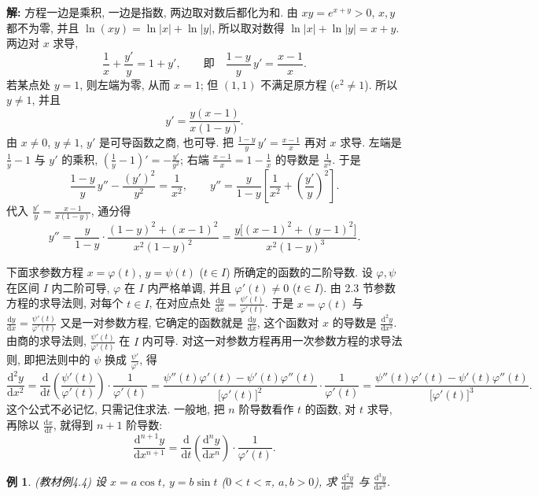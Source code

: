 \documentclass[UTF8,openany]{ctexbook}
\theoremstyle{chinesetextbook}
\newtheorem{example}{例}[section]
\newenvironment{cnsolution}{\par\indent\textbf{解:} \ignorespaces}{\par}
\newcommand{\dd}{\mathrm d}
\begin{document}
\begin{cnsolution}
方程一边是乘积, 一边是指数, 两边取对数后都化为和. 由 $xy=e^{x+y}>0$, $x,y$ 都不为零, 并且 $\ln(xy)=\ln|x|+\ln|y|$, 所以取对数得 $\ln|x|+\ln|y|=x+y$. 两边对 $x$ 求导,
\[
\frac1x+\frac{y'}y=1+y',\qquad\text{即}\quad\frac{1-y}y\,y'=\frac{x-1}x.
\]
若某点处 $y=1$, 则左端为零, 从而 $x=1$; 但 $(1,1)$ 不满足原方程 ($e^2\ne1$). 所以 $y\ne1$, 并且
\[
y'=\frac{y(x-1)}{x(1-y)}.
\]
由 $x\ne0$, $y\ne1$, $y'$ 是可导函数之商, 也可导. 把 $\displaystyle\frac{1-y}y\,y'=\frac{x-1}x$ 再对 $x$ 求导. 左端是 $\displaystyle\frac1y-1$ 与 $y'$ 的乘积, $\displaystyle\left(\frac1y-1\right)'=-\frac{y'}{y^2}$; 右端 $\displaystyle\frac{x-1}x=1-\frac1x$ 的导数是 $\displaystyle\frac1{x^2}$. 于是
\[
\frac{1-y}y\,y''-\frac{(y')^2}{y^2}=\frac1{x^2},\qquad y''=\frac y{1-y}\left[\frac1{x^2}+\left(\frac{y'}y\right)^2\right].
\]
代入 $\displaystyle\frac{y'}y=\frac{x-1}{x(1-y)}$, 通分得
\[
y''=\frac y{1-y}\cdot\frac{(1-y)^2+(x-1)^2}{x^2(1-y)^2}=\frac{y\bigl[(x-1)^2+(y-1)^2\bigr]}{x^2(1-y)^3}.
\]
\end{cnsolution}
下面求参数方程 $x=\varphi(t)$, $y=\psi(t)$ ($t\in I$) 所确定的函数的二阶导数. 设 $\varphi,\psi$ 在区间 $I$ 内二阶可导, $\varphi$ 在 $I$ 内严格单调, 并且 $\varphi'(t)\ne0$ ($t\in I$). 由 2.3 节参数方程的求导法则, 对每个 $t\in I$, 在对应点处 $\displaystyle\frac{\dd y}{\dd x}=\frac{\psi'(t)}{\varphi'(t)}$. 于是 $x=\varphi(t)$ 与 $\displaystyle\frac{\dd y}{\dd x}=\frac{\psi'(t)}{\varphi'(t)}$ 又是一对参数方程, 它确定的函数就是 $\displaystyle\frac{\dd y}{\dd x}$, 这个函数对 $x$ 的导数是 $\displaystyle\frac{\dd^2y}{\dd x^2}$. 由商的求导法则, $\displaystyle\frac{\psi'(t)}{\varphi'(t)}$ 在 $I$ 内可导. 对这一对参数方程再用一次参数方程的求导法则, 即把法则中的 $\psi$ 换成 $\displaystyle\frac{\psi'}{\varphi'}$, 得
\[
\frac{\dd^2y}{\dd x^2}=\frac{\dd}{\dd t}\left(\frac{\psi'(t)}{\varphi'(t)}\right)\cdot\frac1{\varphi'(t)}=\frac{\psi''(t)\varphi'(t)-\psi'(t)\varphi''(t)}{\bigl[\varphi'(t)\bigr]^2}\cdot\frac1{\varphi'(t)}=\frac{\psi''(t)\varphi'(t)-\psi'(t)\varphi''(t)}{\bigl[\varphi'(t)\bigr]^3}.
\]
这个公式不必记忆, 只需记住求法. 一般地, 把 $n$ 阶导数看作 $t$ 的函数, 对 $t$ 求导, 再除以 $\displaystyle\frac{\dd x}{\dd t}$, 就得到 $n+1$ 阶导数:
\[
\frac{\dd^{n+1}y}{\dd x^{n+1}}=\frac{\dd}{\dd t}\left(\frac{\dd^ny}{\dd x^n}\right)\cdot\frac1{\varphi'(t)}.
\]
\begin{example}\label{ex:c2-4-4}
\textnormal{(教材例4.4)} 设 $x=a\cos t$, $y=b\sin t$ ($0<t<\pi$, $a,b>0$), 求 $\displaystyle\frac{\dd^2y}{\dd x^2}$ 与 $\displaystyle\frac{\dd^3y}{\dd x^3}$.
\end{example}
\end{document}
